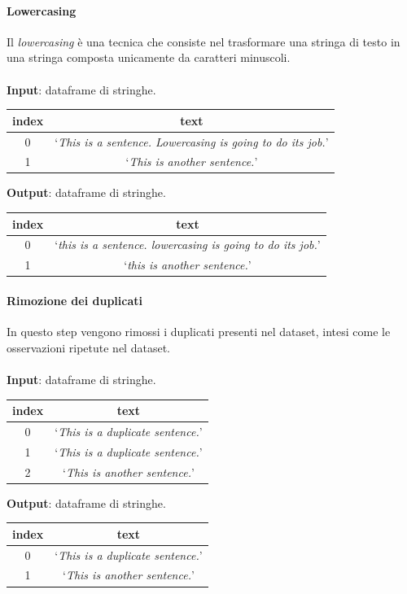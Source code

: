\documentclass[12pt]{report}
\theoremstyle{definition}
\begin{document}
\paragraph{Lowercasing}
Il \textit{lowercasing} è una tecnica che consiste nel trasformare una stringa di testo in una stringa composta unicamente da caratteri minuscoli.
\\
\\
\textbf{Input}: dataframe di stringhe.
\begin{center}
    \begin{tabular}{|c|c|}
    \hline
    \textbf{index} & \textbf{text} \\
    \hline
         0 & `\textit{This is a sentence. Lowercasing is going to do its job.}'\\
         1 & `\textit{This is another sentence.}'\\
    \hline
    \end{tabular}
\end{center}
\textbf{Output}: dataframe di stringhe.
\begin{center}
    \begin{tabular}{|c|c|}
    \hline
    \textbf{index} & \textbf{text} \\
    \hline
         0 & `\textit{this is a sentence. lowercasing is going to do its job.}'\\
         1 & `\textit{this is another sentence.}'\\
    \hline
    \end{tabular}
\end{center}

\paragraph{Rimozione dei duplicati}
In questo step vengono rimossi i duplicati presenti nel dataset, intesi come le osservazioni ripetute nel dataset.
\\
\\
\textbf{Input}: dataframe di stringhe.
\begin{center}
    \begin{tabular}{|c|c|}
    \hline
    \textbf{index} & \textbf{text} \\
    \hline
         0 & `\textit{This is a duplicate sentence.}'\\
         1 & `\textit{This is a duplicate sentence.}'\\
         2 & `\textit{This is another sentence.}'\\
    \hline
    \end{tabular}
\end{center}
\textbf{Output}: dataframe di stringhe.
\begin{center}
    \begin{tabular}{|c|c|}
    \hline
    \textbf{index} & \textbf{text} \\
    \hline
         0 & `\textit{This is a duplicate sentence.}'\\
         1 & `\textit{This is another sentence.}'\\
    \hline
    \end{tabular}
\end{center}
\end{document}
